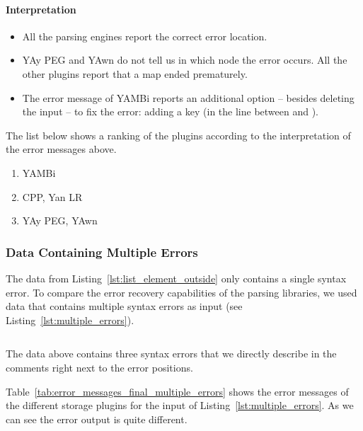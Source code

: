\paragraph{Interpretation}

\begin{itemize}
  \item All the parsing engines report the correct error location.
  \item YAy PEG and YAwn do not tell us in which  node the error occurs. All the other plugins report that a map ended prematurely.
  \item The error message of YAMBi reports an additional option – besides deleting the input – to fix the error: adding a key (in the line between  and ).
\end{itemize}

The list below shows a ranking of the plugins according to the interpretation of the error messages above.

\begin{enumerate}
  \item YAMBi
  \item {} CPP, Yan LR
  \item YAy PEG, YAwn
\end{enumerate}

\subsubsection{ Data Containing Multiple Errors}

The  data from Listing~\ref{lst:list_element_outside} only contains a single syntax error. To compare the error recovery capabilities of the parsing libraries, we used  data that contains multiple syntax errors as input (see Listing~\ref{lst:multiple_errors}).

\begin{listing}
  \begin{code-boxed}
    \inputminted[linenos]{yaml}{Data/Errors/multiple_errors.yaml}
  \end{code-boxed}
  \caption{The  data above contains three syntax errors that we directly describe in the comments right next to the error positions.}
  \label{lst:multiple_errors}
\end{listing}

Table~\ref{tab:error_messages_final_multiple_errors} shows the error messages of the different storage plugins for the  input of Listing~\ref{lst:multiple_errors}. As we can see the error output is quite different.


